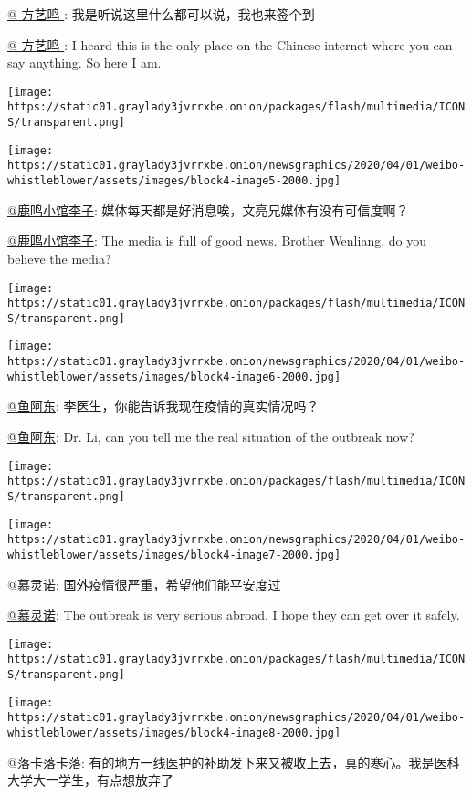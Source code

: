 \href{https://www.weibo.com/626287220?is_hot=1}{@-方艺鸣-}:
我是听说这里什么都可以说，我也来签个到

\href{https://www.weibo.com/626287220?is_hot=1}{@-方艺鸣-}: I heard this
is the only place on the Chinese internet where you can say anything. So
here I am.

\texttt{[image: https://static01.graylady3jvrrxbe.onion/packages/flash/multimedia/ICONS/transparent.png]}

\texttt{[image: https://static01.graylady3jvrrxbe.onion/newsgraphics/2020/04/01/weibo-whistleblower/assets/images/block4-image5-2000.jpg]}

\href{https://www.weibo.com/u/7274780787}{@鹿鸣小馆李子}:
媒体每天都是好消息唉，文亮兄媒体有没有可信度啊？

\href{https://www.weibo.com/u/7274780787}{@鹿鸣小馆李子}: The media is
full of good news. Brother Wenliang, do you believe the media?

\texttt{[image: https://static01.graylady3jvrrxbe.onion/packages/flash/multimedia/ICONS/transparent.png]}

\texttt{[image: https://static01.graylady3jvrrxbe.onion/newsgraphics/2020/04/01/weibo-whistleblower/assets/images/block4-image6-2000.jpg]}

\href{https://www.weibo.com/u/2349970312}{@鱼阿东}:
李医生，你能告诉我现在疫情的真实情况吗？

\href{https://www.weibo.com/u/2349970312}{@鱼阿东}: Dr. Li, can you tell
me the real situation of the outbreak now?

\texttt{[image: https://static01.graylady3jvrrxbe.onion/packages/flash/multimedia/ICONS/transparent.png]}

\texttt{[image: https://static01.graylady3jvrrxbe.onion/newsgraphics/2020/04/01/weibo-whistleblower/assets/images/block4-image7-2000.jpg]}

\href{https://www.weibo.com/u/6002616169}{@慕灵诺}:
国外疫情很严重，希望他们能平安度过

\href{https://www.weibo.com/u/6002616169}{@慕灵诺}: The outbreak is very
serious abroad. I hope they can get over it safely.

\texttt{[image: https://static01.graylady3jvrrxbe.onion/packages/flash/multimedia/ICONS/transparent.png]}

\texttt{[image: https://static01.graylady3jvrrxbe.onion/newsgraphics/2020/04/01/weibo-whistleblower/assets/images/block4-image8-2000.jpg]}

\href{https://www.weibo.com/u/3560720554}{@落卡落卡落}:
有的地方一线医护的补助发下来又被收上去，真的寒心。我是医科大学大一学生，有点想放弃了

